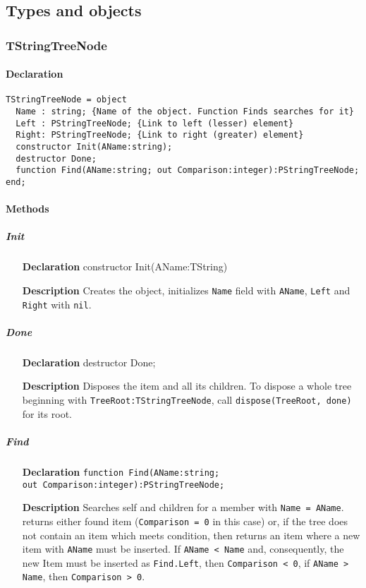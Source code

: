 \documentclass[12pt,a4paper,oneside]{report}
\newcommand{\declarationitem}[1]{\textbf{#1}}
\newcommand{\descriptiontitle}[1]{\textbf{#1}}
\newcommand{\code}[1]{\texttt{#1}}
\begin{document}
\subsection{Types and objects}
\subsubsection{TStringTreeNode}
\paragraph{Declaration\\}
\begin{verbatim}
TStringTreeNode = object
  Name : string; {Name of the object. Function Finds searches for it}
  Left : PStringTreeNode; {Link to left (lesser) element}
  Right: PStringTreeNode; {Link to right (greater) element}
  constructor Init(AName:string);
  destructor Done;
  function Find(AName:string; out Comparison:integer):PStringTreeNode;
end;
\end{verbatim}
\paragraph{Methods\\}
\subparagraph{Init}
\begin{itemize}
\item[\declarationitem{Declaration}\hfill]constructor Init(AName:TString)
\item[\descriptiontitle{Description}]Creates the object, initializes \code{Name} field with \code{AName}, \code{Left} and \code{Right} with \code{nil}.
\end{itemize}
\subparagraph{Done}
\begin{itemize}
\item[\declarationitem{Declaration}\hfill] destructor Done;
\item[\descriptiontitle{Description}]Disposes the item and all its children. To dispose a whole tree beginning with \code{TreeRoot:TStringTreeNode}, call \code{dispose(TreeRoot, done)} for its root.
\end{itemize}
\subparagraph{Find}
\begin{itemize}
	\item[\declarationitem{Declaration}]\code{function Find(AName:string;\\{}\hspace*{2cm} out Comparison:integer):PStringTreeNode;}
	\item[\descriptiontitle{Description}] Searches self and children for a member with \code{Name = AName}. returns either found item (\code{Comparison = 0} in this case) or, if the tree does not contain an item which meets condition, then returns an item where a new item with \code{AName} must be inserted. If \code{AName < Name} and, consequently, the new Item must be inserted as \code{Find.Left}, then \code{Comparison < 0}, if \code{AName > Name}, then \code{Comparison > 0}.  
\end{itemize}
\end{document}
